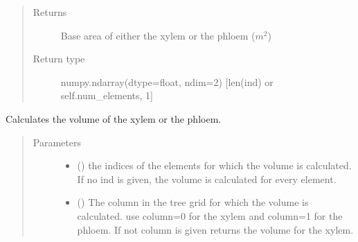 \documentclass[letterpaper,10pt,english]{sphinxmanual}
\begin{document}
\begin{fulllineitems}
\begin{fulllineitems}
\begin{quote}
\begin{description}
\begin{itemize}
\end{itemize}

\item[{Returns}] \leavevmode
Base area of either
the xylem or the phloem (\(m^2\))

\item[{Return type}] \leavevmode
numpy.ndarray(dtype=float, ndim=2) {[}len(ind) or self.num\_elements, 1{]}

\end{description}\end{quote}

\end{fulllineitems}


\begin{fulllineitems}
\label{\detokenize{index:src.tree.Tree.element_volume}}
Calculates the volume of the xylem or the phloem.
\begin{quote}\begin{description}
\item[{Parameters}] \leavevmode\begin{itemize}
\item {} 
 (\sphinxstyleliteralemphasis{\sphinxupquote{{[}}}\sphinxstyleliteralemphasis{\sphinxupquote{{]} or }}\sphinxstyleliteralemphasis{\sphinxupquote{(}}\sphinxstyleliteralemphasis{\sphinxupquote{, }}\sphinxstyleliteralemphasis{\sphinxupquote{)}}\sphinxstyleliteralemphasis{\sphinxupquote{, }}) \textendash{} the indices of the elements
for which the volume is calculated. If no ind is given, the volume is calculated
for every element.

\item {} 
 (\sphinxstyleliteralemphasis{\sphinxupquote{, }}) \textendash{} The column in the tree grid for which the volume is calculated.
use column=0 for the xylem and column=1 for the phloem. If not column is given returns
the volume for the xylem.


\end{itemize}
\end{description}
\end{quote}
\end{fulllineitems}
\end{fulllineitems}
\end{document}
